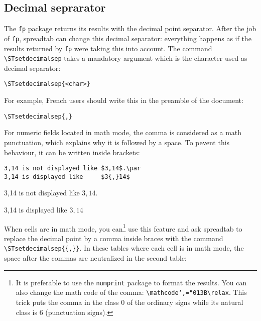 \documentclass[a4paper,10pt]{article}
\newcommand\verbinline[1][]{\lstinline[breaklines=false,basicstyle=\normalsize\ttfamily,#1]}
\newcommand\ST{\textsf{spreadtab}\xspace}
\begin{document}
\begin{<table environment>}
\subsection{Decimal seprarator}
The \verb-fp- package returns its results with the decimal point separator. After the job of \verb-fp-, \ST can change this decimal separator: everything happens as if the results returned by \verb-fp- were taking this into account. The command \verbinline-\STsetdecimalsep- takes a mandatory argument which is the character used as decimal separator:
\begin{center}
\verbinline-\STsetdecimalsep-\verb-{<char>}-
\end{center}
For example, French users should write this in the preamble of the document:
\begin{center}
\verbinline-\STsetdecimalsep{,}-
\end{center}
For numeric fields located in math mode, the comma is considered as a math punctuation, which explains why it is followed by a space. To pevent this behaviour, it can be written inside brackets:

\begin{minipage}{0.65\linewidth}
\begin{lstlisting}[backgroundcolor=\color{ST@codebckgcolor}]
3,14 is not displayed like $3,14$.\par
3,14 is displayed like     $3{,}14$
\end{lstlisting}
\end{minipage}\hfill
\begin{minipage}{0.35\linewidth}
3,14 is not displayed like $3,14$.\par
3,14 is displayed like     $3{,}14$
\end{minipage}%

When cells are in math mode, you can\footnote{It is preferable to use the \texttt{numprint} package to format the results. You can also change the math code of the comma: \texttt{\textbackslash mathcode`,="013B\textbackslash relax}. This trick puts the comma in the class 0 of the ordinary signs while its natural class is 6 (punctuation signs).} use this feature and ask \ST to replace the decimal point by a comma inside braces with the command \verbinline-\STsetdecimalsep{{,}}-. In these tables where each cell is in math mode, the space after the commas are neutralized in the second table:


\end{<table environment>}
\end{document}
